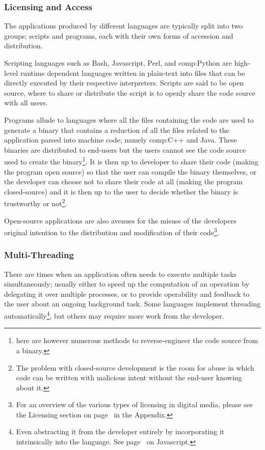 \subsubsection{Licensing and Access}

The applications produced by different languages are typically split into two groups; scripts and programs, each with their own forms of accession and distribution.

Scripting languages such as Bash, Javascript, Perl, and \gls{comp:Python} \cite{vanrossum2010python} are high-level runtime dependent languages written in plain-text into files that can be directly executed by their respective interpreters. Scripts are said to be open source, where to share or distribute the script is to openly share the code source with all users.

Programs allude to languages where all the files containing the code are used to generate a binary that contains a reduction of all the files related to the application parsed into machine code; namely \gls{comp:C++} and Java. These binaries are distributed to end-users but the users cannot see the code source used to create the binary\footnote{here are however numerous methods to reverse-engineer the code source from a binary.}. It is then up to developer to share their code (making the program open source) so that the user can compile the binary themselves, or the developer can choose not to share their code at all (making the program closed-source) and it is then up to the user to decide whether the binary is trustworthy or not\footnote{The problem with closed-source development is the room for abuse in which code can be written with malicious intent without the end-user knowing about it.}.

Open-source applications are also avenues for the misuse of the developers original intention to the distribution and modification of their code\footnote{For an overview of the various types of licensing in digital media, please see the Licensing section on page~\pageref{ref:app:licensing} in the Appendix.}.

\subsubsection{Multi-Threading}

There are times when an application often needs to execute multiple tasks simultaneously; usually either to speed up the computation of an operation by delegating it over multiple processes, or to provide operability and feedback to the user about an ongoing background task. Some languages implement threading automatically\footnote{Even abstracting it from the developer entirely by incorporating it intrinsically into the language. See page~\pageref{ref:haplo:javaover} on Javascript.}, but others may require more work from the developer.

